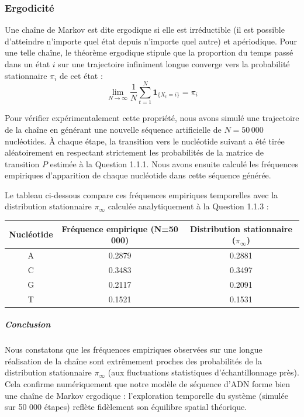 \subsubsection{Ergodicité}

Une chaîne de Markov est dite ergodique si elle est irréductible 
(il est possible d'atteindre n'importe quel état depuis n'importe quel autre) et apériodique. 
Pour une telle chaîne, le théorème ergodique stipule que la proportion du temps passé dans un 
état $i$ sur une trajectoire infiniment longue converge vers la probabilité 
stationnaire $\pi_i$ de cet état :
\begin{equation}
    \lim_{N \to \infty} \frac{1}{N} \sum_{t=1}^N \mathbf{1}_{\{X_t = i\}} = \pi_i
\end{equation}

Pour vérifier expérimentalement cette propriété, nous avons simulé une trajectoire de la 
chaîne en générant une nouvelle séquence artificielle de $N = 50\,000$ nucléotides. À 
chaque étape, la transition vers le nucléotide suivant a été tirée aléatoirement en respectant 
strictement les probabilités de la matrice de transition $P$ estimée à la Question 1.1.1. 
Nous avons ensuite calculé les fréquences empiriques d'apparition de chaque nucléotide dans 
cette séquence générée.

Le tableau ci-dessous compare ces fréquences empiriques temporelles avec la distribution 
stationnaire $\pi_\infty$ calculée analytiquement à la Question 1.1.3 :

\begin{center}
\renewcommand{\arraystretch}{1.2} %
\begin{tabular}{|c|c|c|}
    \hline
    \textbf{Nucléotide} & \textbf{Fréquence empirique (N=50 000)} & \textbf{Distribution stationnaire ($\pi_\infty$)} \\
    \hline
    A & 0.2879 & 0.2881 \\ 
    C & 0.3483 & 0.3497 \\ 
    G & 0.2117 & 0.2091 \\ 
    T & 0.1521 & 0.1531 \\ 
    \hline
\end{tabular}
\end{center}

\subparagraph{Conclusion}
Nous constatons que les fréquences empiriques observées sur une longue réalisation de la 
chaîne sont extrêmement proches des probabilités de la distribution stationnaire $\pi_\infty$ 
(aux fluctuations statistiques d'échantillonnage près). Cela confirme numériquement que 
notre modèle de séquence d'ADN forme bien une chaîne de Markov ergodique : 
l'exploration temporelle du système (simulée sur 50 000 étapes) reflète fidèlement son 
équilibre spatial théorique.